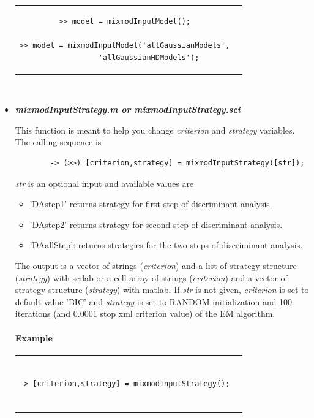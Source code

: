 \begin{itemize}
\begin{tabular}{c|c}
\begin{minipage}[c]{0.45\columnwidth}
{\begin{verbatim}
>> model = mixmodInputModel();

>> model = mixmodInputModel('allGaussianModels',
           'allGaussianHDModels');
\end{verbatim}}
\end{minipage}%
\end{tabular}\\






\item {\textbf {{\large {\em mixmodInputStrategy.m or mixmodInputStrategy.sci}}}}

This function is meant to help you change {\em criterion} and {\em  strategy} variables.
The calling sequence is
\begin{verbatim}
        -> (>>) [criterion,strategy] = mixmodInputStrategy([str]);
\end{verbatim}

{\em str} is an optional input and available values are
	\begin{itemize}
		\item 'DAstep1'  returns strategy for first step of discriminant analysis.
		\item 'DAstep2'  returns strategy for second step of discriminant analysis.
		\item 'DAallStep': returns strategies for the two steps of discriminant analysis.
        \end{itemize}

The output is a vector of strings ({\em criterion}) and a list of strategy structure ({\em strategy}) with scilab
or a cell array of strings ({\em criterion}) and a vector of strategy structure ({\em strategy}) with matlab.
If {\em str} is not given, {\em criterion} is set to default value 'BIC' and {\em strategy} is set to RANDOM
initialization and 100 iterations (and 0.0001 stop xml criterion value) of the EM algorithm.


\paragraph{Example\\}

\begin{tabular}{c|c}
\begin{minipage}[c]{0.55\columnwidth}%
{\scriptsize
\begin{verbatim}

-> [criterion,strategy] = mixmodInputStrategy();


\end{verbatim}}
\end{minipage}
\end{tabular}
\end{itemize}
